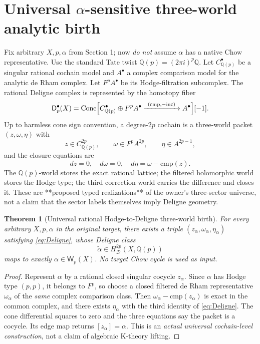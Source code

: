 \documentclass[11pt]{article}
\newtheorem{theorem}{Theorem}[section]
\newcommand{\Q}{\mathbb Q}
\newcommand{\W}{\mathsf W}
\newcommand{\HD}{H_{\mathcal D}}
\begin{document}
\section{Universal \(\alpha\)-sensitive three-world analytic birth}

Fix arbitrary \(X,p,\alpha\) from Section 1; now \emph{do not}
assume \(\alpha\) has a native Chow representative.
Use the standard Tate twist \(\Q(p)=(2\pi i)^p\Q\).
Let \(C^\bullet_{\Q(p)}\) be a singular rational cochain model and
\(A^\bullet\) a complex comparison model for the analytic de Rham complex.
Let \(F^pA^\bullet\) be its Hodge-filtration subcomplex.
The rational Deligne complex is represented by the homotopy fiber
\[
\mathsf D^\bullet_p(X)=\operatorname{Cone}
\Bigl[
C^\bullet_{\Q(p)}\oplus F^pA^\bullet
\xrightarrow{\ (\mathrm{cmp},-\mathrm{inc})\ }
A^\bullet
\Bigr][-1].
\]
Up to harmless cone sign convention, a degree-\(2p\)
cochain is a three-world packet
\((z,\omega,\eta)\) with
\[
z\in C^{2p}_{\Q(p)},\qquad
\omega\in F^pA^{2p},\qquad
\eta\in A^{2p-1},
\]
and the closure equations are
\begin{equation}\label{eq:Deligne}
dz=0,\quad d\omega=0,\quad
d\eta=\omega-\mathrm{cmp}(z).
\end{equation}
The \(\Q(p)\)-world stores the exact rational lattice;
the filtered holomorphic world stores the Hodge type;
the third correction world carries the difference and closes it.
These are **proposed typed realizations** of the owner's three-sector
universe, not a claim that the sector labels themselves imply
Deligne geometry.

\begin{theorem}[Universal rational Hodge-to-Deligne three-world birth]
For every arbitrary \(X,p,\alpha\) in the original target,
there exists a triple \((z_\alpha,\omega_\alpha,\eta_\alpha)\)
satisfying \eqref{eq:Deligne}, whose Deligne class
\[
\widetilde\alpha\in \HD^{2p}(X,\Q(p))
\]
maps to exactly \(\alpha\in\W_p(X)\).
No target Chow cycle is used as input.
\end{theorem}
\begin{proof}
Represent \(\alpha\) by a rational closed singular cocycle \(z_\alpha\).
Since \(\alpha\) has Hodge type \((p,p)\), it belongs to \(F^p\),
so choose a closed filtered de Rham representative \(\omega_\alpha\)
of the \emph{same} complex comparison class.
Then \(\omega_\alpha-\mathrm{cmp}(z_\alpha)\) is exact in the common
complex, and there exists \(\eta_\alpha\) with the third identity
of \eqref{eq:Deligne}. The cone differential squares to zero and
the three equations say the packet is a cocycle. Its edge map
returns \([z_\alpha]=\alpha\). This is an \emph{actual universal
cochain-level construction}, not a claim of algebraic K-theory lifting.
\end{proof}
\end{document}
